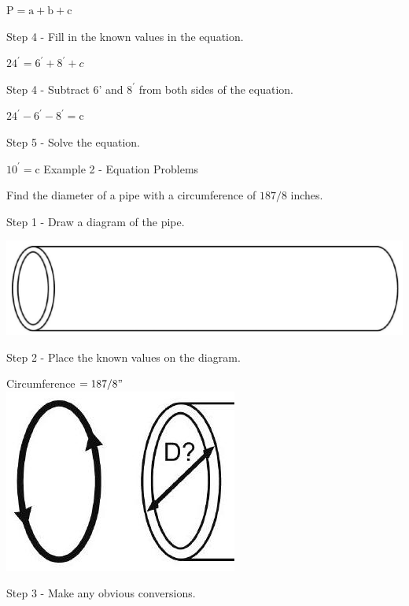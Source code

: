 \documentclass[10pt]{article}
\begin{document}
$\mathrm{P}=\mathrm{a}+\mathrm{b}+\mathrm{c}$

Step 4 - Fill in the known values in the equation.

$24^{\prime}=6^{\prime}+8^{\prime}+c$

Step 4 - Subtract 6' and $8^{\prime}$ from both sides of the equation.

$24^{\prime}-6^{\prime}-8^{\prime}=\mathrm{c}$

Step 5 - Solve the equation.

$10^{\prime}=\mathrm{c}$ Example 2 - Equation Problems

Find the diameter of a pipe with a circumference of $187 / 8$ inches.

Step 1 - Draw a diagram of the pipe.

\includegraphics[max width=\textwidth]{2022_09_11_72dbedc910e6e984560cg-21}

Step 2 - Place the known values on the diagram.

Circumference $=187 / 8 "$\\

\includegraphics[max width=\textwidth]{2022_09_11_72dbedc910e6e984560cg-21(1)}

Step 3 - Make any obvious conversions.
\end{document}
